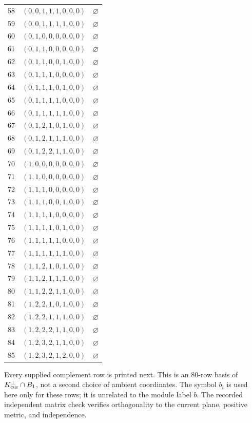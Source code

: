 \begin{longtable}{@{}rll@{}}
58 & $(0,0,1,1,1,0,0,0)$ & $\varnothing$\\
59 & $(0,0,1,1,1,1,0,0)$ & $\varnothing$\\
60 & $(0,1,0,0,0,0,0,0)$ & $\varnothing$\\
61 & $(0,1,1,0,0,0,0,0)$ & $\varnothing$\\
62 & $(0,1,1,0,0,1,0,0)$ & $\varnothing$\\
63 & $(0,1,1,1,0,0,0,0)$ & $\varnothing$\\
64 & $(0,1,1,1,0,1,0,0)$ & $\varnothing$\\
65 & $(0,1,1,1,1,0,0,0)$ & $\varnothing$\\
66 & $(0,1,1,1,1,1,0,0)$ & $\varnothing$\\
67 & $(0,1,2,1,0,1,0,0)$ & $\varnothing$\\
68 & $(0,1,2,1,1,1,0,0)$ & $\varnothing$\\
69 & $(0,1,2,2,1,1,0,0)$ & $\varnothing$\\
70 & $(1,0,0,0,0,0,0,0)$ & $\varnothing$\\
71 & $(1,1,0,0,0,0,0,0)$ & $\varnothing$\\
72 & $(1,1,1,0,0,0,0,0)$ & $\varnothing$\\
73 & $(1,1,1,0,0,1,0,0)$ & $\varnothing$\\
74 & $(1,1,1,1,0,0,0,0)$ & $\varnothing$\\
75 & $(1,1,1,1,0,1,0,0)$ & $\varnothing$\\
76 & $(1,1,1,1,1,0,0,0)$ & $\varnothing$\\
77 & $(1,1,1,1,1,1,0,0)$ & $\varnothing$\\
78 & $(1,1,2,1,0,1,0,0)$ & $\varnothing$\\
79 & $(1,1,2,1,1,1,0,0)$ & $\varnothing$\\
80 & $(1,1,2,2,1,1,0,0)$ & $\varnothing$\\
81 & $(1,2,2,1,0,1,0,0)$ & $\varnothing$\\
82 & $(1,2,2,1,1,1,0,0)$ & $\varnothing$\\
83 & $(1,2,2,2,1,1,0,0)$ & $\varnothing$\\
84 & $(1,2,3,2,1,1,0,0)$ & $\varnothing$\\
85 & $(1,2,3,2,1,2,0,0)$ & $\varnothing$\\
\end{longtable}
\endgroup
Every supplied complement row is printed next. This is an
80-row basis of $K_{\rm cur}^{\perp}\cap B_1$, not a second choice of
ambient coordinates. The symbol $b_i$ is used here only for these rows;
it is unrelated to the module label $b$. The recorded independent matrix
check verifies orthogonality to the current plane, positive metric, and
independence.

